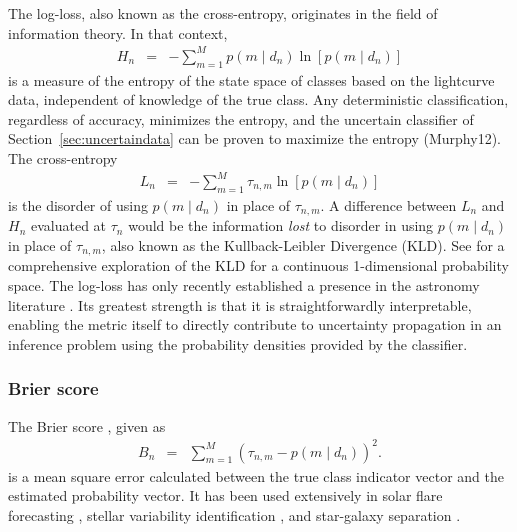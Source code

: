 The log-loss, also known as the cross-entropy, originates in the field of information theory.
In that context,
\begin{eqnarray}
  \label{eq:entropy}
  H_{n} &=& -\sum_{m=1}^{M}p(m \mid d_{n})\ln[p(m \mid d_{n})]
\end{eqnarray}
is a measure of the entropy of the state space of classes based on the lightcurve data, independent of knowledge of the true class.
Any deterministic classification, regardless of accuracy, minimizes the entropy, and the uncertain classifier of Section~\ref{sec:uncertaindata} can be proven to maximize the entropy (Murphy12).
The cross-entropy
\begin{eqnarray}
  \label{eq:logloss}
  L_{n} &=& -\sum_{m=1}^{M}\tau_{n, m}\ln[p(m \mid d_{n})]
\end{eqnarray}
is the disorder of using $p(m \mid d_{n})$ in place of $\tau_{n, m}$.
A difference between $L_{n}$ and $H_{n}$ evaluated at $\tau_{n}$ would be the information \textit{lost} to disorder in using $p(m \mid d_{n})$ in place of $\tau_{n, m}$, also known as the Kullback-Leibler Divergence (KLD).
See \cite{2018AJ....156...35M} for a comprehensive exploration of the KLD for a continuous 1-dimensional probability space.
The log-loss has only recently established a presence in the astronomy literature \citep{hon_deep_2017, hon_deep_2018}.
Its greatest strength is that it is straightforwardly interpretable, enabling the metric itself to directly contribute to uncertainty propagation in an inference problem using the probability densities provided by the classifier.

\subsubsection{Brier score}
\label{sec:brier}

The Brier score \cite{brier_verification_1950}, given as
\begin{eqnarray}
  \label{eq:brier}
B_{n} &=& \sum_{m=1}^{M}(\tau_{n, m}-p(m \mid d_{n}))^{2}.
\end{eqnarray}
is a mean square error calculated between the true class indicator vector and the estimated probability vector.
It has been used extensively in solar flare forecasting \cite{crown_validation, mays_ensemble_2015, florios_forecasting_2018}, stellar variability identification \citep{richards_construction_2012, armstrong_k2_2016}, and star-galaxy separation \citep{kim_hybrid_2015}.

